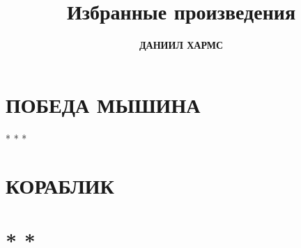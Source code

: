 \documentclass[a4paper, 12pt]{article}
\title{\fontsize{36pt}{44pt}\selectfont\bfseries Избранные произведения}
\author{\Huge\bfseries ДАНИИЛ ХАРМС}
\date{}
\begin{document}
\maketitle

\section*{ПОБЕДА МЫШИНА}


\vspace{3.5ex}

\begin{center}
* * *
\end{center}

\section*{КОРАБЛИК}


\section*{\normalfont * * *}

\end{document}
